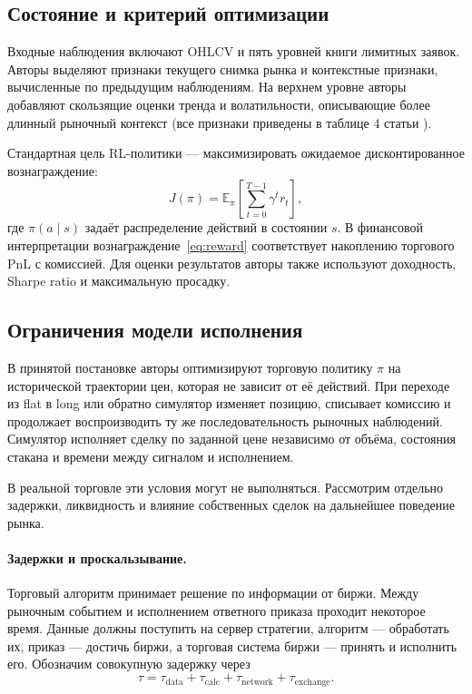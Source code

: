 \documentclass[9pt,a4paper,twocolumn]{extarticle}
\newcommand{\Exp}{\mathbb{E}}
\begin{document}
\subsection{Состояние и критерий оптимизации}

Входные наблюдения включают OHLCV и пять уровней книги лимитных заявок. Авторы выделяют признаки
текущего снимка рынка и контекстные признаки, вычисленные по предыдущим наблюдениям. На верхнем
уровне авторы добавляют скользящие оценки тренда и волатильности, описывающие более длинный
рыночный контекст (все признаки приведены в таблице 4 статьи \cite{zong2024macrohft}).

Стандартная цель RL-политики --- максимизировать ожидаемое дисконтированное вознаграждение:
\begin{equation}
  J(\pi)=\Exp_{\pi}\!\left[
    \sum_{t=0}^{T-1}\gamma^t r_t
  \right],
  \label{eq:objective}
\end{equation}
где $\pi(a\mid s)$ задаёт распределение действий в состоянии $s$. В финансовой интерпретации
вознаграждение~\eqref{eq:reward} соответствует накоплению торгового PnL с комиссией. Для оценки
результатов авторы также используют доходность, Sharpe ratio и максимальную просадку.


\subsection{Ограничения модели исполнения}
\label{sec:execution_limitations}

В принятой постановке авторы оптимизируют торговую политику $\pi$ на исторической траектории
цен, которая не зависит от её действий. При переходе из flat в long или обратно симулятор
изменяет позицию, списывает комиссию и продолжает воспроизводить ту же последовательность
рыночных наблюдений. Симулятор исполняет сделку по заданной цене независимо от объёма, состояния
стакана и времени между сигналом и исполнением.

В реальной торговле эти условия могут не выполняться. Рассмотрим отдельно задержки, ликвидность
и влияние собственных сделок на дальнейшее поведение рынка.

\paragraph{Задержки и проскальзывание.}

Торговый алгоритм принимает решение по информации от биржи. Между рыночным событием и
исполнением ответного приказа проходит некоторое время. Данные должны поступить на сервер
стратегии, алгоритм --- обработать их, приказ --- достичь биржи, а торговая система
биржи --- принять и исполнить его. Обозначим совокупную задержку через
\begin{equation}
    \tau =
    \tau_{\mathrm{data}}
    + \tau_{\mathrm{calc}}
    + \tau_{\mathrm{network}}
    + \tau_{\mathrm{exchange}}.
    \label{eq:execution_latency}
\end{equation}
\end{document}

